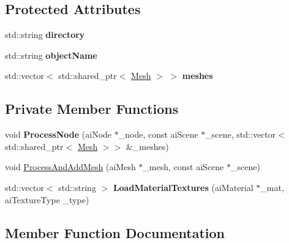 \subsection*{Protected Attributes}
\begin{DoxyCompactItemize}
\item 
\mbox{\label{classpiolot_1_1_object_ab361363059783f44a48c24529aef482e}} 
std\+::string {\bfseries directory}
\item 
\mbox{\label{classpiolot_1_1_object_a1995f97bb181bf6aeee850052c01dd24}} 
std\+::string {\bfseries object\+Name}
\item 
\mbox{\label{classpiolot_1_1_object_a4a26c60e9239d03e7c31a243c0325934}} 
std\+::vector$<$ std\+::shared\+\_\+ptr$<$ \mbox{\hyperlink{classpiolot_1_1_mesh}{Mesh}} $>$ $>$ {\bfseries meshes}
\end{DoxyCompactItemize}
\subsection*{Private Member Functions}
\begin{DoxyCompactItemize}
\item 
\mbox{\label{classpiolot_1_1_object_ace45406ebc032ac05e6b9bb388ebc3c2}} 
void {\bfseries Process\+Node} (ai\+Node $\ast$\+\_\+node, const ai\+Scene $\ast$\+\_\+scene, std\+::vector$<$ std\+::shared\+\_\+ptr$<$ \mbox{\hyperlink{classpiolot_1_1_mesh}{Mesh}} $>$$>$ \&\+\_\+meshes)
\item 
void \mbox{\hyperlink{classpiolot_1_1_object_ab917dddc7f767962960e607ada13a4d5}{Process\+And\+Add\+Mesh}} (ai\+Mesh $\ast$\+\_\+mesh, const ai\+Scene $\ast$\+\_\+scene)
\item 
\mbox{\label{classpiolot_1_1_object_a87d3fb79aa882718cf10d72f85a397dc}} 
std\+::vector$<$ std\+::string $>$ {\bfseries Load\+Material\+Textures} (ai\+Material $\ast$\+\_\+mat, ai\+Texture\+Type \+\_\+type)
\end{DoxyCompactItemize}


\subsection{Member Function Documentation}
\mbox{\label{classpiolot_1_1_object_ab917dddc7f767962960e607ada13a4d5}} 
